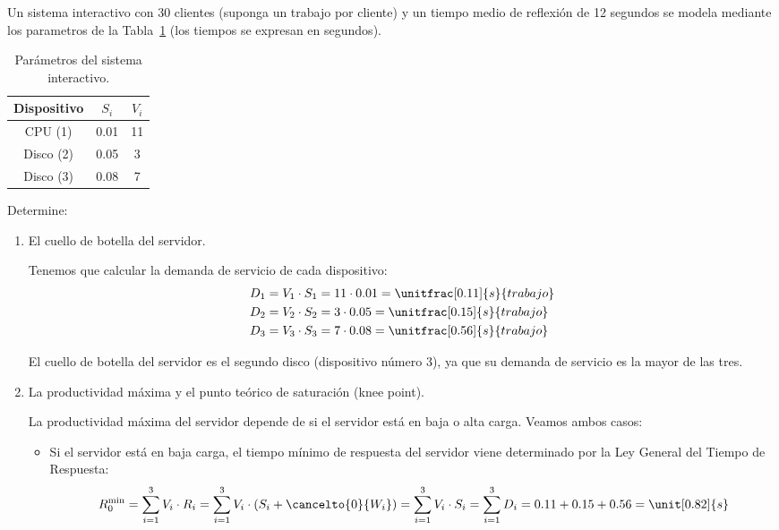 \begin{ejercicio}\label{ej:5.17}
    Un sistema interactivo con 30 clientes (suponga un trabajo por cliente) y un tiempo medio de reflexión de 12 segundos se modela mediante los parametros de la Tabla~\ref{tab:5.17}
    (los tiempos se expresan en segundos).
    \begin{table}[h]
        \centering
        \begin{tabular}{|c|c|c|}
            \hline
            Dispositivo & $S_i$ & $V_i$ \\
            \hline
            CPU (1) & 0.01 & 11 \\
            Disco (2) & 0.05 & 3 \\
            Disco (3) & 0.08 & 7 \\
            \hline
        \end{tabular}
        \caption{Parámetros del sistema interactivo.}
        \label{tab:5.17}
    \end{table}
    Determine:
    \begin{enumerate}
        \item El cuello de botella del servidor.
        
        Tenemos que calcular la demanda de servicio de cada dispositivo:
        \begin{align*}
            D_1 &= V_1 \cdot S_1 = 11 \cdot 0.01 = \unitfrac[0.11]{s}{trabajo} \\
            D_2 &= V_2 \cdot S_2 = 3 \cdot 0.05 = \unitfrac[0.15]{s}{trabajo} \\
            D_3 &= V_3 \cdot S_3 = 7 \cdot 0.08 = \unitfrac[0.56]{s}{trabajo}
        \end{align*}

        El cuello de botella del servidor es el segundo disco (dispositivo número $3$), ya que su demanda de servicio es la mayor de las tres.
        \item La productividad máxima y el punto teórico de saturación (knee point).
        
        La productividad máxima del servidor depende de si el servidor está en baja o alta carga. Veamos ambos casos:
        \begin{itemize}
            \item Si el servidor está en baja carga, el tiempo mínimo de respuesta del servidor viene determinado por la Ley General del Tiempo de Respuesta:
            \begin{equation*}
                R_0^{\text{min}} = \sum_{i=1}^{3} V_i \cdot R_i = \sum_{i=1}^{3} V_i \cdot (S_i + \cancelto{0}{W_i}) = \sum_{i=1}^{3} V_i \cdot S_i = \sum_{i=1}^{3} D_i = 0.11 + 0.15 + 0.56 = \unit[0.82]{s}
            \end{equation*}


\end{itemize}
\end{enumerate}
\end{ejercicio}
